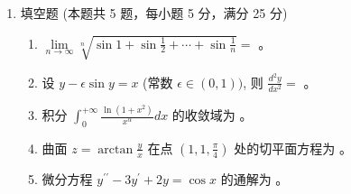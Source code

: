 

\begin{enumerate}
	\item
	填空题 (本题共 5 题，每小题 5 分，满分 25 分)
	\begin{enumerate}
		\item
	$\lim\limits _{n \rightarrow \infty} \sqrt[n]{\sin 1+\sin \frac{1}{2}+\cdots+\sin \frac{1}{n}}=$  。
		
		
		\item
		设 $y-\epsilon \sin y=x$ (常数 $\epsilon \in(0,1))$, 则 $\frac{d^{2} y}{d x^{2}}=$  。
		
		
		\item
		积分 $\int_{0}^{+\infty} \frac{\ln \left(1+x^{2}\right)}{x^{\alpha}} d x$ 的收敛域为  。
		
		
		\item
		 曲面 $z=\arctan \frac{y}{x}$ 在点 $\left(1,1, \frac{\pi}{4}\right)$ 处的切平面方程为  。
		
		
		\item
		微分方程 $y^{\prime \prime}-3 y^{\prime}+2 y=\cos x$ 的通解为  。
		
		
		
		
	\end{enumerate}

\end{enumerate}

